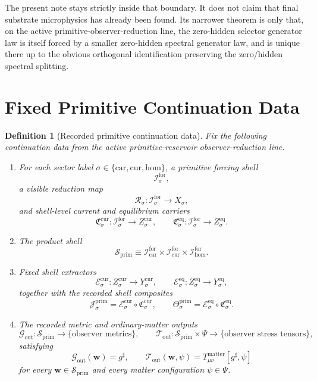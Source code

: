 \documentclass[11pt]{article}
\newcommand{\CompletedMetric}{g^{\sharp}}
\newcommand{\Car}{\mathrm{car}}
\newcommand{\Cur}{\mathrm{cur}}
\newcommand{\Hom}{\mathrm{hom}}
\newcommand{\ForSpace}[1]{\mathcal I_{#1}^{\mathrm{for}}}
\newcommand{\PrimShell}{\mathcal S_{\mathrm{prim}}}
\newcommand{\Reduction}[1]{\mathcal R_{#1}}
\newcommand{\CurrentCarrier}[1]{\mathfrak C_{#1}^{\mathrm{cur}}}
\newcommand{\EqCarrier}[1]{\mathfrak C_{#1}^{\mathrm{eq}}}
\newcommand{\CurrentExtract}[1]{\mathscr E_{#1}^{\mathrm{cur}}}
\newcommand{\EqExtract}[1]{\mathscr E_{#1}^{\mathrm{eq}}}
\newcommand{\PrimCurrent}[1]{\mathcal J_{#1}^{\mathrm{prim}}}
\newcommand{\PrimTheta}[1]{\Theta_{#1}^{\mathrm{prim}}}
\newcommand{\MetricOut}{\mathscr G_{\mathrm{out}}}
\newcommand{\MatterOut}{\mathscr T_{\mathrm{out}}}
\newtheorem{definition}{Definition}
\begin{document}
The present note stays strictly inside that boundary. It does not claim that final substrate microphysics has already been found. Its narrower theorem is only that, on the active primitive-observer-reduction line, the zero-hidden selector generator law is itself forced by a smaller zero-hidden spectral generator law, and is unique there up to the obvious orthogonal identification preserving the zero/hidden spectral splitting.

\section{Fixed Primitive Continuation Data}

\begin{definition}[Recorded primitive continuation data]
\label{def:fixed}
Fix the following continuation data from the active primitive-reservoir observer-reduction line.
\begin{enumerate}
    \item For each sector label \(\sigma\in\{\Car,\Cur,\Hom\}\), a primitive forcing shell
    \[
    \ForSpace{\sigma},
    \]
    a visible reduction map
    \[
    \Reduction{\sigma}:\ForSpace{\sigma}\to X_{\sigma},
    \]
    and shell-level current and equilibrium carriers
    \[
    \CurrentCarrier{\sigma}:\ForSpace{\sigma}\to Z_{\sigma}^{\mathrm{cur}},
    \qquad
    \EqCarrier{\sigma}:\ForSpace{\sigma}\to Z_{\sigma}^{\mathrm{eq}}.
    \]
    \item The product shell
    \[
    \PrimShell
    \equiv
    \ForSpace{\Car}\times \ForSpace{\Cur}\times \ForSpace{\Hom}.
    \]
    \item Fixed shell extractors
    \[
    \CurrentExtract{\sigma}:Z_{\sigma}^{\mathrm{cur}}\to Y_{\sigma}^{\mathrm{cur}},
    \qquad
    \EqExtract{\sigma}:Z_{\sigma}^{\mathrm{eq}}\to Y_{\sigma}^{\mathrm{eq}},
    \]
    together with the recorded shell composites
    \begin{equation}
    \PrimCurrent{\sigma}
    =
    \CurrentExtract{\sigma}\circ \CurrentCarrier{\sigma},
    \qquad
    \PrimTheta{\sigma}
    =
    \EqExtract{\sigma}\circ \EqCarrier{\sigma}.
    \label{eq:primcomposites}
    \end{equation}
    \item The recorded metric and ordinary-matter outputs
    \[
    \MetricOut:\PrimShell\to\{\text{observer metrics}\},
    \qquad
    \MatterOut:\PrimShell\times\Psi\to\{\text{observer stress tensors}\},
    \]
    satisfying
    \begin{equation}
    \MetricOut(\mathbf w)=\CompletedMetric,
    \qquad
    \MatterOut(\mathbf w,\psi)
    =
    T_{\mu\nu}^{\mathrm{matter}}[\CompletedMetric,\psi]
    \label{eq:fixedoutputs}
    \end{equation}
    for every \(\mathbf w\in\PrimShell\) and every matter configuration \(\psi\in\Psi\).
\end{enumerate}
\end{definition}
\end{document}
